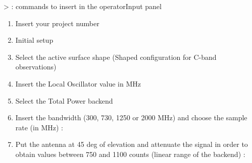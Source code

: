 \documentclass[letterpaper,10pt,english]{sphinxmanual}
\begin{document}
\textgreater{} : commands to insert in the operatorInput panel
\begin{enumerate}
\item {} 
Insert your project number
\begin{quote}

\end{quote}

\item {} 
Initial setup
\begin{quote}


\end{quote}

\item {} 
Select the active surface shape (Shaped configuration for C-band observations)
\begin{quote}

\end{quote}

\item {} 
Insert the Local Oscillator value in MHz
\begin{quote}

\end{quote}

\item {} 
Select the Total Power backend
\begin{quote}

\end{quote}

\item {} 
Insert the bandwidth (300, 730, 1250 or 2000 MHz) and choose the sample rate (in MHz) :
\begin{quote}


\end{quote}

\item {} 
Put the antenna at 45 deg of elevation and attenuate the signal in order to obtain values between 750 and 1100 counts (linear range of the backend) :
\begin{quote}



\end{quote}
\end{enumerate}
\end{document}

